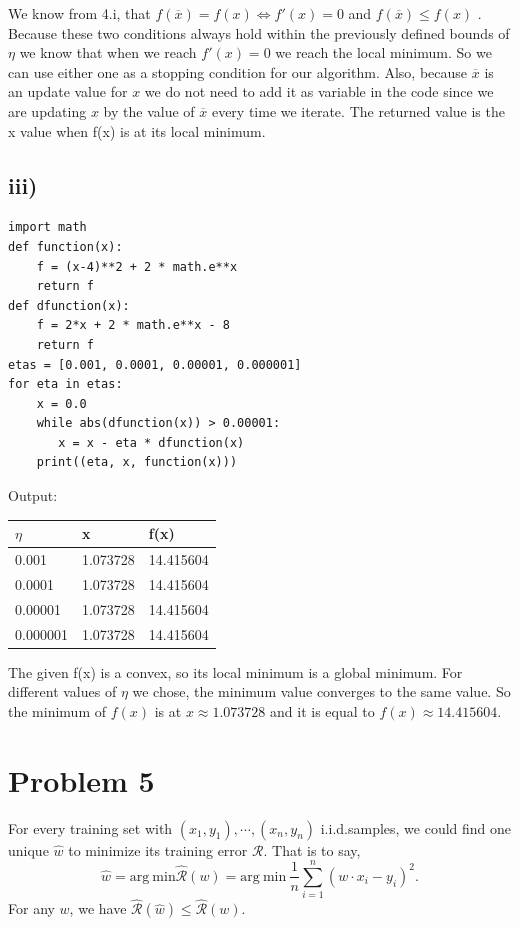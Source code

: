 \documentclass[twoside,11pt]{homework}
\begin{document}
We know from 4.i, that $f(\overline{x}) = f(x) \Longleftrightarrow f'(x) = 0$ and  $f(\overline{x}) \leq f(x)$ . Because these two conditions always hold within the previously defined bounds of $\eta$ we know that when we reach $f'(x)=0$ we reach the local minimum. So we can use either one as a stopping condition for our algorithm. Also, because $\overline{x}$ is an update value for $x$ we do not need to add it as variable in the code since we are updating $x$ by the value of $\overline{x}$ every time we iterate. The returned value is the x value when f(x) is at its local minimum. 
\subsection*{iii)}
\begin{lstlisting}
import math
def function(x):
    f = (x-4)**2 + 2 * math.e**x
    return f
def dfunction(x):
    f = 2*x + 2 * math.e**x - 8
    return f
etas = [0.001, 0.0001, 0.00001, 0.000001]
for eta in etas:
    x = 0.0
    while abs(dfunction(x)) > 0.00001:
       x = x - eta * dfunction(x)
    print((eta, x, function(x)))
\end{lstlisting}
Output:
\begin{table}[h]
\begin{tabular}{|l|l|l|}
\hline
$\eta$   & x        & f(x)  \\ \hline
0.001    & 1.073728 & 14.415604 \\ \hline
0.0001   & 1.073728 & 14.415604 \\ \hline
0.00001  & 1.073728 & 14.415604 \\ \hline
0.000001 & 1.073728 & 14.415604  \\ \hline
\end{tabular}
\end{table}

The given f(x) is a convex, so its local minimum is a global minimum. For different values of $\eta$ we chose, the minimum value converges to the same value. So the minimum of $f(x)$ is at $x \approx 1.073728$ and it is equal to $f(x) \approx 14.415604$. 
\newpage
\section*{Problem 5}
For every training set with $(x_1, y_1), \cdots, (x_n, y_n)$ i.i.d.samples, we could find one unique $\hat{w}$ to minimize its training error $\mathcal{R}$.
That is to say,
\begin{equation*}
   \hat{w} = \mathrm{arg\ min} \hat{\mathcal{R}}(w) = \mathrm{arg\ min}\ \frac{1}{n} \sum_{i=1}^n (w \cdot x_i - y_i)^2. 
\end{equation*}
For any $w$, we have $\hat{\mathcal{R}}(\hat{w}) \le \hat{\mathcal{R}}(w) $.%
\end{document}
